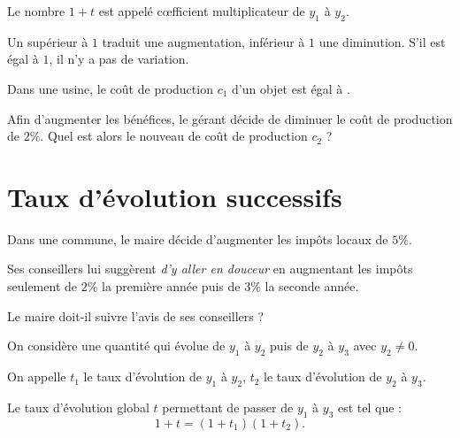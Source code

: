 \documentclass[xcolor={dvipsnames,svgnames,table}]{beamer}
\begin{document}
\begin{frame}
    \begin{Definition}
        Le nombre $1 + t$ est appelé \alert{c{\oe}fficient multiplicateur} de $y_1$ à $y_2$.\par
        Un \coef supérieur à $1$ traduit une augmentation, inférieur à $1$ une diminution. S'il est égal à $1$, il n'y a pas de variation.
    \end{Definition}
\end{frame}

\begin{frame}
    \begin{Example}
        Dans une usine, le coût de production $c_1$ d'un objet est égal à .\par
        Afin d'augmenter les bénéfices, le gérant décide de diminuer le coût de production de $2\%$. Quel est alors le nouveau de coût de production $c_2$ ?\medskip

        \rule{0pt}{4cm}
    \end{Example}
\end{frame}

\section{Taux d'évolution successifs}

\begin{frame}
    \begin{Example}
        Dans une commune, le maire décide d'augmenter les impôts locaux de $5\%$.\par
        Ses conseillers lui suggèrent \textit{d'y aller en douceur} en augmentant les impôts seulement de $2\%$ la première année puis de $3\%$ la seconde année.\par
        Le maire doit-il suivre l'avis de ses conseillers ?
    \end{Example}
\end{frame}

\begin{frame}
    \begin{Prop}
        On considère une quantité qui évolue de $y_1$ à $y_2$ puis de $y_2$ à $y_3$ avec $y_2 \neq 0$.\par
        On appelle $t_1$ le taux d'évolution de $y_1$ à $y_2$, $t_2$ le taux d'évolution de $y_2$ à $y_3$.\par
        Le taux d'évolution global $t$ permettant de passer de $y_1$ à $y_3$ est tel que :\[1+t = (1 + t_1)(1 + t_2).\]
    \end{Prop}
\pause
    \begin{Proof}
        \rule{0pt}{2.5cm}
    \end{Proof}
\end{frame}
\end{document}
